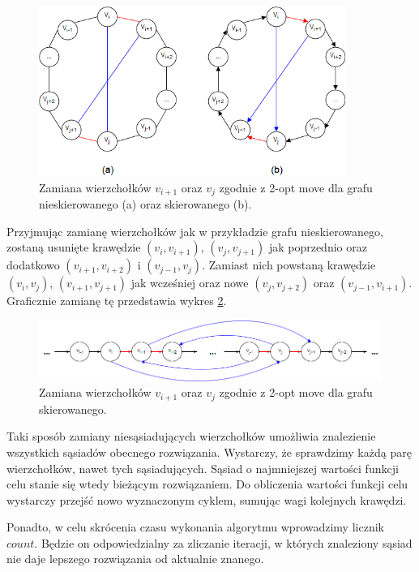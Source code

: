 \documentclass[11pt,a4paper,twoside]{article}
\begin{document}
\begin{figure}[ht]
\vspace{-0pt}
\centering
\includegraphics[width=10cm]{2opt4krawedzie}
\caption{Zamiana wierzchołków $v_{i+1}$ oraz $v_{j}$ zgodnie z 2-opt move dla grafu nieskierowanego (a) oraz skierowanego (b).}
\label{2opt4krawedzie}
\end{figure}



Przyjmując zamianę wierzchołków jak w przykładzie grafu nieskierowanego, zostaną usunięte krawędzie $(v_{i}, v_{i+1})$, $(v_{j}, v_{j+1})$ jak poprzednio oraz dodatkowo $(v_{i+1}, v_{i+2})$ i $(v_{j-1}, v_{j})$. Zamiast nich powstaną krawędzie $(v_{i}, v_{j})$, $(v_{i+1}, v_{j+1})$ jak wcześniej oraz nowe $(v_{j}, v_{j+2})$ oraz $(v_{j-1}, v_{i+1})$. Graficznie zamianę tę przedstawia wykres \ref{2optMove}.

\begin{figure}[ht]
\vspace{-0pt}
\centering
\includegraphics[width=15cm]{2optMove}
\caption{Zamiana wierzchołków $v_{i+1}$ oraz $v_{j}$ zgodnie z 2-opt move dla grafu skierowanego.}
\label{2optMove}
\end{figure}

Taki sposób zamiany niesąsiadujących wierzchołków umożliwia znalezienie wszystkich sąsiadów obecnego rozwiązania. Wystarczy, że sprawdzimy każdą parę wierzchołków, nawet tych sąsiadujących. Sąsiad o najmniejszej wartości funkcji celu stanie się wtedy bieżącym rozwiązaniem. Do obliczenia wartości funkcji celu wystarczy przejść nowo wyznaczonym cyklem, sumując wagi kolejnych krawędzi.

Ponadto, w celu skrócenia czasu wykonania algorytmu wprowadzimy licznik $count$. Będzie on odpowiedzialny za zliczanie iteracji, w których znaleziony sąsiad nie daje lepszego rozwiązania od aktualnie znanego.
\end{document}
